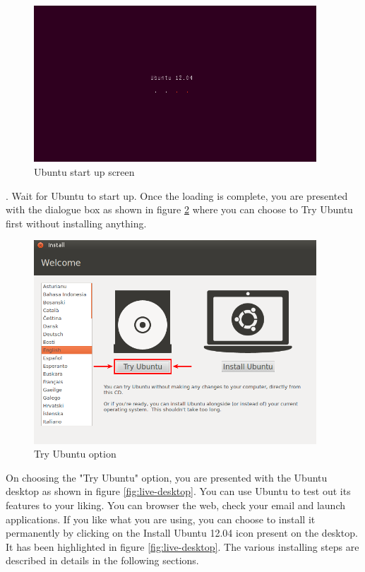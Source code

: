 \begin{figure}[h!]	
	\begin{center}
	\includegraphics[width=300pt]{./images/installation/basic-start.png}
	\caption{Ubuntu start up screen}	
	\label{fig:start-up}	
	\end{center}
\end{figure}

\par {}. Wait for Ubuntu to start up. Once the loading is complete, you are presented with the dialogue box as shown in figure \ref{fig:live-options} where you can choose to Try Ubuntu first without installing anything.\\

\begin{figure}[!h]	
	\begin{center}
	\includegraphics[width=300pt]{./images/installation/install-live-start.png}
	\caption{Try Ubuntu option}	
	\label{fig:live-options}	
	\end{center}
\end{figure}

\newpage
\par \noindent On choosing the "Try Ubuntu" option, you are presented with the Ubuntu desktop as shown in figure \ref{fig:live-desktop}. You can use Ubuntu to test out its features to your liking. You can browser the web, check your email and launch applications. If you like what you are using, you can choose to install it permanently by clicking on the Install Ubuntu 12.04 icon present on the desktop. It has been highlighted in figure \ref{fig:live-desktop}. The various installing steps are described in details in the following sections. \\

